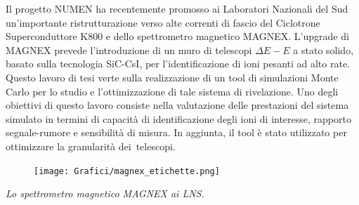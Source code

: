 \documentclass[10pt,foldmark,notumble]{leaflet}
\newcommand{\geant}{Geant4}
\begin{document}
Il progetto NUMEN ha recentemente promosso ai Laboratori Nazionali del Sud un'importante ristrutturazione verso alte correnti di fascio del Ciclotrone Superconduttore K800 e dello spettrometro magnetico MAGNEX.
L'upgrade di MAGNEX prevede l'introduzione di un muro di telescopi $\Delta E - E$ a stato solido, basato sulla tecnologia SiC-CsI, per l'identificazione di ioni pesanti ad alto rate.
Questo lavoro di tesi verte sulla realizzazione di un tool di simulazioni Monte Carlo per lo studio e l'ottimizzazione di tale sistema di rivelazione.
Uno degli obiettivi di questo lavoro consiste nella valutazione delle prestazioni del sistema simulato in termini di capacità di identificazione degli ioni di interesse, rapporto segnale-rumore e sensibilità di misura.
In aggiunta, il tool è stato utilizzato per ottimizzare la granularità dei~telescopi.



\begin{figure} [!h]
	\centering
	\texttt{[image: Grafici/magnex\_etichette.png]}
\end{figure}
\hspace{0.8 cm}\textit{ Lo spettrometro magnetico MAGNEX ai LNS.}


\end{document}
